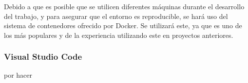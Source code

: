 Debido a que es posible que se utilicen diferentes máquinas durante el desarrollo del trabajo, y para asegurar que el entorno es reproducible, se hará uso del sistema de contenedores ofrecido por Docker. Se utilizará este, ya que es uno de los más populares y de la experiencia utilizando este en proyectos anteriores.

\subsubsection{Visual Studio Code}

por hacer
